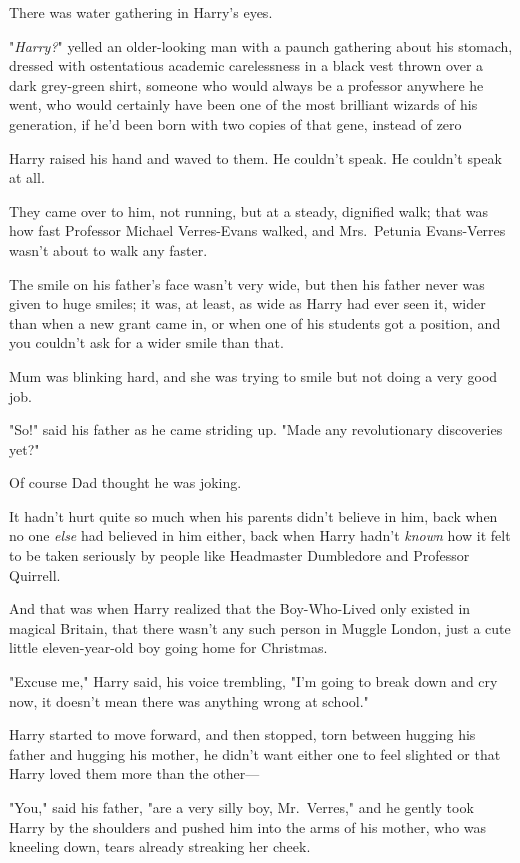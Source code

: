 There was water gathering in Harry's eyes.

"\emph{Harry?}" yelled an older-looking man with a paunch gathering about his
stomach, dressed with ostentatious academic carelessness in a black vest thrown
over a dark grey-green shirt, someone who would always be a professor anywhere
he went, who would certainly have been one of the most brilliant wizards of his
generation, if he'd been born with two copies of that gene, instead of
zero{\el}

Harry raised his hand and waved to them. He couldn't speak. He couldn't speak
at all.

They came over to him, not running, but at a steady, dignified walk; that was
how fast Professor Michael Verres-Evans walked, and Mrs.~Petunia Evans-Verres
wasn't about to walk any faster.

The smile on his father's face wasn't very wide, but then his father never was
given to huge smiles; it was, at least, as wide as Harry had ever seen it,
wider than when a new grant came in, or when one of his students got a
position, and you couldn't ask for a wider smile than that.

Mum was blinking hard, and she was trying to smile but not doing a very good
job.

"So!" said his father as he came striding up. "Made any revolutionary
discoveries yet?"

Of course Dad thought he was joking.

It hadn't hurt quite so much when his parents didn't believe in him, back when
no one \emph{else} had believed in him either, back when Harry hadn't
\emph{known} how it felt to be taken seriously by people like Headmaster
Dumbledore and Professor Quirrell.

And that was when Harry realized that the Boy-Who-Lived only existed in magical
Britain, that there wasn't any such person in Muggle London, just a cute little
eleven-year-old boy going home for Christmas.

"Excuse me," Harry said, his voice trembling, "I'm going to break down and cry
now, it doesn't mean there was anything wrong at school."

Harry started to move forward, and then stopped, torn between hugging his
father and hugging his mother, he didn't want either one to feel slighted or
that Harry loved them more than the other—

"You," said his father, "are a very silly boy, Mr.~Verres," and he gently took
Harry by the shoulders and pushed him into the arms of his mother, who was
kneeling down, tears already streaking her cheek.

